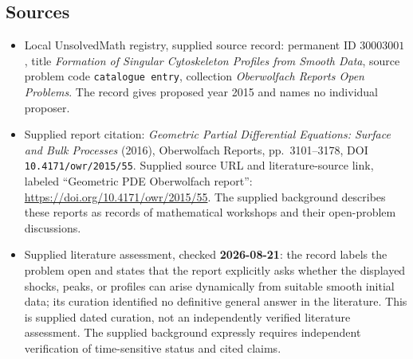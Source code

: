 \documentclass[11pt]{article}
\begin{document}
\subsection{Sources}
\begin{itemize}
\item Local UnsolvedMath registry, supplied source record: permanent ID \(30003001\), title \emph{Formation of Singular Cytoskeleton Profiles from Smooth Data}, source problem code \texttt{catalogue entry}, collection \emph{Oberwolfach Reports Open Problems}. The record gives proposed year 2015 and names no individual proposer.
\item Supplied report citation: \emph{Geometric Partial Differential Equations: Surface and Bulk Processes} (2016), Oberwolfach Reports, pp.\ 3101--3178, DOI \texttt{10.4171/owr/2015/55}. Supplied source URL and literature-source link, labeled ``Geometric PDE Oberwolfach report'': \url{https://doi.org/10.4171/owr/2015/55}. The supplied background describes these reports as records of mathematical workshops and their open-problem discussions.
\item Supplied literature assessment, checked \textbf{2026-08-21}: the record labels the problem open and states that the report explicitly asks whether the displayed shocks, peaks, or profiles can arise dynamically from suitable smooth initial data; its curation identified no definitive general answer in the literature. This is supplied dated curation, not an independently verified literature assessment. The supplied background expressly requires independent verification of time-sensitive status and cited claims.
\end{itemize}
\end{document}
